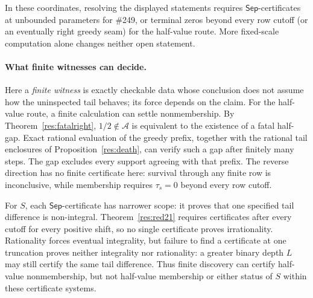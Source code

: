 \documentclass[11pt]{article}
\theoremstyle{definition}
\theoremstyle{remark}
\begin{document}
In these coordinates, resolving the displayed statements requires
\(\mathsf{Sep}\)-certificates at unbounded parameters for \#249, or terminal
zeros beyond every row cutoff (or an eventually right greedy seam) for the
half-value route.  More fixed-scale computation alone changes neither open
statement.

\paragraph{What finite witnesses can decide.}
Here a \emph{finite witness} is exactly checkable data whose conclusion does
not assume how the uninspected tail behaves; its force depends on the claim.
For the half-value route, a finite calculation can settle nonmembership.
By Theorem~\ref{res:fatalright}, \(1/2\notin\mathcal A\) is equivalent to the
existence of a fatal half-gap.  Exact rational evaluation of the greedy
prefix, together with the rational tail enclosures of
Proposition~\ref{res:death}, can verify such a gap after finitely many steps.
The gap excludes every support agreeing with that prefix.  The reverse
direction has no finite certificate here: survival through any finite row is
inconclusive, while membership requires \(\tau_s=0\) beyond every row cutoff.

For \(S\), each \(\mathsf{Sep}\)-certificate has narrower scope: it proves
that one specified tail difference is non-integral.  Theorem~\ref{res:red21}
requires certificates after every cutoff for every positive shift, so no
single certificate proves irrationality.  Rationality forces eventual
integrality, but failure to find a certificate at one truncation proves
neither integrality nor rationality: a greater binary depth \(L\) may still
certify the same tail difference.  Thus finite discovery can certify
half-value nonmembership, but not half-value membership or either status of
\(S\) within these certificate systems.
\end{document}
